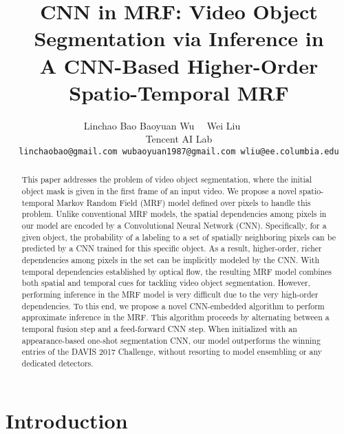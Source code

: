 \documentclass[10pt,twocolumn,letterpaper]{article}
\begin{document}


\title{CNN in MRF: Video Object Segmentation via Inference in \\A CNN-Based Higher-Order Spatio-Temporal MRF}



\author{Linchao Bao \quad\quad Baoyuan Wu \quad\quad \ \ Wei Liu\ \ \ \ \ \ \  \\
Tencent AI Lab\\
{\tt\small linchaobao@gmail.com \quad wubaoyuan1987@gmail.com \quad wliu@ee.columbia.edu}
}

\maketitle
\thispagestyle{empty}

\begin{abstract}
This paper addresses the problem of video object segmentation, where the initial object mask is given in the first frame of an input video.
We propose a novel spatio-temporal Markov Random Field (MRF) model defined over pixels to handle this problem.
Unlike conventional MRF models, the spatial dependencies among pixels in our model are encoded by a Convolutional Neural Network (CNN).
Specifically, for a given object, the probability of a labeling to a set of spatially neighboring pixels can be predicted by a CNN trained for this specific object.
As a result, higher-order, richer dependencies among pixels in the set can be implicitly modeled by the CNN.
With temporal dependencies established by optical flow, the resulting MRF model combines both spatial and temporal cues for tackling video object segmentation.
However, performing inference in the MRF model is very difficult due to the very high-order dependencies.
To this end, we propose a novel CNN-embedded algorithm to perform approximate inference in the MRF.
This algorithm proceeds by alternating between a temporal fusion step and a feed-forward CNN step.
When initialized with an appearance-based one-shot segmentation CNN, our model outperforms the winning entries of the DAVIS 2017 Challenge,
without resorting to model ensembling or any dedicated detectors.




\end{abstract}


\section{Introduction}
\end{document}
